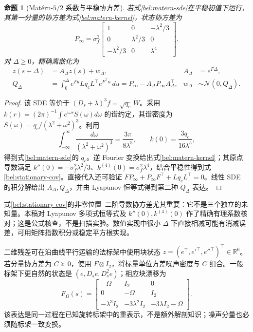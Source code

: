 \documentclass[11pt,a4paper]{article}
\numberwithin{equation}{section}
\newtheorem{proposition}[theorem]{命题}
\theoremstyle{definition}
\newcommand{\R}{\mathbb R}
\begin{document}
\begin{proposition}[Mat\'ern-$5/2$ 系数与平稳协方差]
\label{bel:prop-matern}
若式\eqref{bel:matern-sde}在平稳初值下运行，其第一分量的协方差为式\eqref{bel:matern-kernel}，状态协方差为
\begin{equation}
 P_\infty=\sigma_f^2
 \begin{bmatrix}
 1&0&-\lambda^2/3\\
 0&\lambda^2/3&0\\
 -\lambda^2/3&0&\lambda^4
 \end{bmatrix}.
 \label{bel:stationary-cov}
\end{equation}
对 $\Delta\ge0$，精确离散化为
\begin{align}
 z(s+\Delta)&=A_\Delta z(s)+w_\Delta,
 &A_\Delta&=e^{F\Delta},\\
 Q_\Delta&=\int_0^\Delta e^{Fu}Lq_cL^\top e^{F^\top u}\,du
 =P_\infty-A_\Delta P_\infty A_\Delta^\top,
 &w_\Delta&\sim\mathcal N(0,Q_\Delta).
 \label{bel:discrete-sde}
\end{align}
\end{proposition}
\begin{proof}
该 SDE 等价于 $(D_s+\lambda)^3f=\sqrt{q_c}\,\dot W$。采用
$k(r)=(2\pi)^{-1}\int e^{\mathrm i\omega r}S(\omega)d\omega$ 的谱约定，其谱密度为
$S(\omega)=q_c/(\lambda^2+\omega^2)^3$。利用
\begin{equation}
 \int_{-\infty}^{\infty}\frac{d\omega}{(\lambda^2+\omega^2)^3}
 =\frac{3\pi}{8\lambda^5},\qquad
 k(0)=\frac{3q_c}{16\lambda^5},
\end{equation}
得到式\eqref{bel:matern-sde}的 $q_c$。逆 Fourier 变换给出式\eqref{bel:matern-kernel}；其原点导数满足
$k''(0)=-\sigma_f^2\lambda^2/3$、$k^{(4)}(0)=\sigma_f^2\lambda^4$，结合平稳性得到式\eqref{bel:stationary-cov}。直接代入还可验证
$FP_\infty+P_\infty F^\top+Lq_cL^\top=0$。线性 SDE 的积分解给出 $A_\Delta,Q_\Delta$，并由 Lyapunov 恒等式得到第二种 $Q_\Delta$ 表达。
\end{proof}

式\eqref{bel:stationary-cov}的非零位置--二阶导数协方差尤其重要：它不是三个独立的未知量。本稿对 Lyapunov 多项式恒等式及 $k''(0),k^{(4)}(0)$ 作了精确有理系数核对；这是公式核查，不是扫描实验。数值实现中很小 $\Delta$ 下直接相减可能有消减误差，可用矩阵指数积分或稳定平方根实现。

二维残差可在沿曲线平行运输的法标架中使用块状态
$z=(e^\top,e'^\top,e''^\top)^\top\in\R^6$。若分量协方差为 $C\succeq0$，使用 $F\otimes I_2$，将标量单位方差噪声密度与 $C$ 组合。一般标架下更自然的状态是
$(e,D_se,D_s^2e)$；相应块漂移为
\begin{equation}
 F_\Omega(s)=
 \begin{bmatrix}
 -\Omega&I_2&0\\
 0&-\Omega&I_2\\
 -\lambda^3I_2&-3\lambda^2I_2&-3\lambda I_2-\Omega
 \end{bmatrix}.
 \label{bel:covariant-sde}
\end{equation}
该表达是同一过程在已知旋转标架中的重表示，不是额外解剖知识；噪声分量也必须随标架一致变换。
\end{document}

